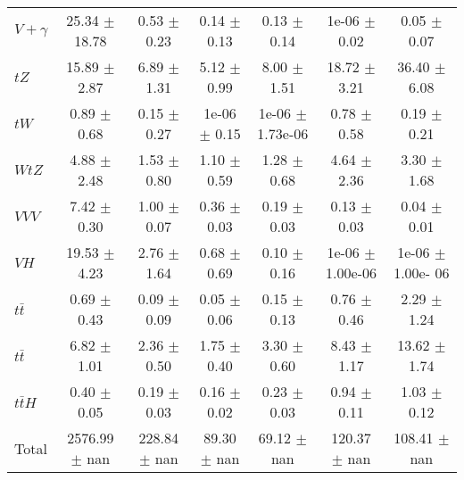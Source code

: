 \begin{tabular}{|l|S|S|S|S|S|S|}
  $V+\gamma$   & 25.34 $\pm$ 18.78 & 0.53 $\pm$ 0.23 & 0.14 $\pm$ 0.13 & 0.13 $\pm$ 0.14 & 1e-06 $\pm$ 0.02 & 0.05 $\pm$ 0.07 \\ 
  $tZ$   & 15.89 $\pm$ 2.87 & 6.89 $\pm$ 1.31 & 5.12 $\pm$ 0.99 & 8.00 $\pm$ 1.51 & 18.72 $\pm$ 3.21 & 36.40 $\pm$ 6.08 \\ 
  $tW$   & 0.89 $\pm$ 0.68 & 0.15 $\pm$ 0.27 & 1e-06 $\pm$ 0.15 & 1e-06 $\pm$ 1.73e-06 & 0.78 $\pm$ 0.58 & 0.19 $\pm$ 0.21 \\ 
  $WtZ$   & 4.88 $\pm$ 2.48 & 1.53 $\pm$ 0.80 & 1.10 $\pm$ 0.59 & 1.28 $\pm$ 0.68 & 4.64 $\pm$ 2.36 & 3.30 $\pm$ 1.68 \\ 
  $VVV$   & 7.42 $\pm$ 0.30 & 1.00 $\pm$ 0.07 & 0.36 $\pm$ 0.03 & 0.19 $\pm$ 0.03 & 0.13 $\pm$ 0.03 & 0.04 $\pm$ 0.01 \\ 
  $VH$   & 19.53 $\pm$ 4.23 & 2.76 $\pm$ 1.64 & 0.68 $\pm$ 0.69 & 0.10 $\pm$ 0.16 & 1e-06 $\pm$ 1.00e-06 & 1e-06 $\pm$ 1.00e- 06 \\ 
  $t\bar{t}$   & 0.69 $\pm$ 0.43 & 0.09 $\pm$ 0.09 & 0.05 $\pm$ 0.06 & 0.15 $\pm$ 0.13 & 0.76 $\pm$ 0.46 & 2.29 $\pm$ 1.24 \\ 
  $t\bar{t}$   & 6.82 $\pm$ 1.01 & 2.36 $\pm$ 0.50 & 1.75 $\pm$ 0.40 & 3.30 $\pm$ 0.60 & 8.43 $\pm$ 1.17 & 13.62 $\pm$ 1.74 \\ 
  $t\bar{t}H$   & 0.40 $\pm$ 0.05 & 0.19 $\pm$ 0.03 & 0.16 $\pm$ 0.02 & 0.23 $\pm$ 0.03 & 0.94 $\pm$ 0.11 & 1.03 $\pm$ 0.12 \\ 
\hline 
  Total  & 2576.99 $\pm$ nan & 228.84 $\pm$ nan & 89.30 $\pm$ nan & 69.12 $\pm$ nan & 120.37 $\pm$ nan & 108.41 $\pm$ nan \\ 
\hline 
\end{tabular} 
